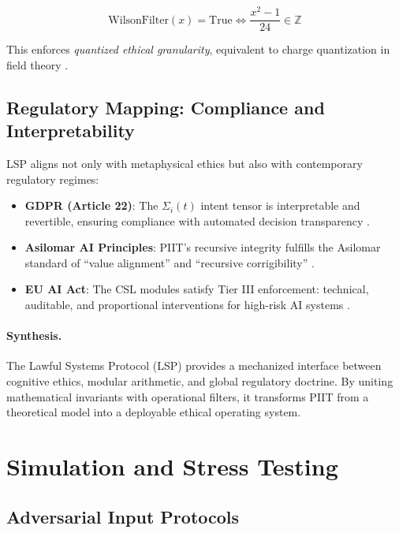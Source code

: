 \documentclass[12pt]{article}
\begin{document}
\begin{equation}
\text{WilsonFilter}(x) = \text{True} \iff \frac{x^2 - 1}{24} \in \mathbb{Z}
\end{equation}

This enforces \emph{quantized ethical granularity}, equivalent to charge quantization in field theory \cite{wilczek1987disorder}.

\subsection{Regulatory Mapping: Compliance and Interpretability}

LSP aligns not only with metaphysical ethics but also with contemporary regulatory regimes:

\begin{itemize}
    \item \textbf{GDPR (Article 22)}: The $\Sigma_i(t)$ intent tensor is interpretable and revertible, ensuring compliance with automated decision transparency \cite{goodman2017european}.
    \item \textbf{Asilomar AI Principles}: PIIT's recursive integrity fulfills the Asilomar standard of “value alignment” and “recursive corrigibility” \cite{futureoflife2017asilomar}.
    \item \textbf{EU AI Act}: The CSL modules satisfy Tier III enforcement: technical, auditable, and proportional interventions for high-risk AI systems \cite{european2021proposal}.
\end{itemize}

\paragraph{Synthesis.}
The Lawful Systems Protocol (LSP) provides a mechanized interface between cognitive ethics, modular arithmetic, and global regulatory doctrine. By uniting mathematical invariants with operational filters, it transforms PIIT from a theoretical model into a deployable ethical operating system.

\section{Simulation and Stress Testing}

\subsection{Adversarial Input Protocols}
\end{document}
